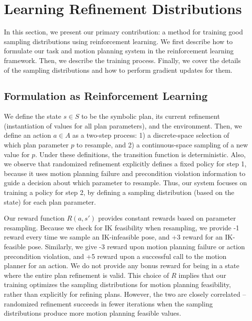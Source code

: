 \section{Learning Refinement Distributions}
In this section, we present our primary contribution: a method
for training good sampling distributions using reinforcement learning.
We first describe how to formulate our task and motion planning system
in the reinforcement learning framework. Then, we describe the training
process. Finally, we cover the details of the sampling distributions
and how to perform gradient updates for them.

\subsection{Formulation as Reinforcement Learning}
We define the state $s \in S$ to be the symbolic plan, its current refinement
(instantiation of values for all plan parameters), and the environment. Then, we define an action $a \in A$ as
a two-step process: 1) a discrete-space selection of which plan parameter $p$ to
resample, and 2) a continuous-space sampling of a new value for $p$. Under
these definitions, the transition function is deterministic. Also, we observe that
randomized refinement explicitly defines a fixed policy for
step 1, because it uses motion planning failure and precondition violation information
to guide a decision about which parameter to resample. Thus, our system focuses
on training a policy for step 2, by defining a sampling distribution (based on the
state) for each plan parameter.

Our reward function $R(a, s')$ provides constant rewards based on parameter resampling.
Because we check for IK feasibility when resampling, we provide -1 reward every
time we sample an IK-infeasible pose, and +3 reward for an IK-feasible pose.
Similarly, we give -3 reward upon motion planning failure or action precondition violation,
and +5 reward upon a successful call to the motion planner for an action. We do not
provide any bonus reward for being in a state where the entire plan refinement is valid.
This choice of $R$ implies that our training optimizes the sampling distributions for
motion planning feasibility, rather than explicitly for refining plans. However, the two are
closely correlated -- randomized refinement succeeds in fewer iterations when the sampling
distributions produce more motion planning feasible values.

